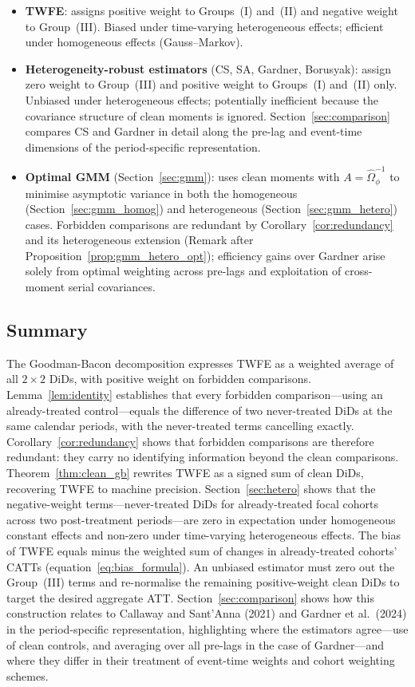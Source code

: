 \documentclass[12pt,letterpaper]{article}
\theoremstyle{remark}
\theoremstyle{definition}
\begin{document}
\begin{itemize}
  \item \textbf{TWFE}: assigns positive weight to Groups~(I) and~(II) and
    negative weight to Group~(III). Biased under time-varying heterogeneous
    effects; efficient under homogeneous effects (Gauss--Markov).

  \item \textbf{Heterogeneity-robust estimators} (CS, SA, Gardner, Borusyak):
    assign zero weight to Group~(III) and positive weight to Groups~(I)
    and~(II) only. Unbiased under heterogeneous effects; potentially
    inefficient because the covariance structure of clean moments is ignored.
    Section~\ref{sec:comparison} compares CS and Gardner in detail along the
    pre-lag and event-time dimensions of the period-specific representation.

  \item \textbf{Optimal GMM} (Section~\ref{sec:gmm}): uses clean moments
    with $A=\hat{\Omega}_\phi^{-1}$ to minimise asymptotic variance in both
    the homogeneous (Section~\ref{sec:gmm_homog}) and heterogeneous
    (Section~\ref{sec:gmm_hetero}) cases. Forbidden comparisons are
    redundant by Corollary~\ref{cor:redundancy} and its heterogeneous
    extension (Remark after Proposition~\ref{prop:gmm_hetero_opt});
    efficiency gains over Gardner arise solely from optimal weighting across
    pre-lags and exploitation of cross-moment serial covariances.
\end{itemize}

\subsection{Summary}

The Goodman-Bacon decomposition expresses TWFE as a weighted average of all
$2\times2$ DiDs, with positive weight on forbidden comparisons.
Lemma~\ref{lem:identity} establishes that every forbidden comparison---using an
already-treated control---equals the difference of two never-treated DiDs at the
same calendar periods, with the never-treated terms cancelling exactly.
Corollary~\ref{cor:redundancy} shows that forbidden comparisons are therefore
redundant: they carry no identifying information beyond the clean comparisons.
Theorem~\ref{thm:clean_gb} rewrites TWFE as a signed sum of clean DiDs,
recovering TWFE to machine precision. Section~\ref{sec:hetero} shows that the
negative-weight terms---never-treated DiDs for already-treated focal cohorts
across two post-treatment periods---are zero in expectation under homogeneous
constant effects and non-zero under time-varying heterogeneous effects. The bias
of TWFE equals minus the weighted sum of changes in already-treated cohorts'
CATTs (equation~\eqref{eq:bias_formula}). An unbiased estimator must zero out
the Group~(III) terms and re-normalise the remaining positive-weight clean DiDs
to target the desired aggregate ATT. Section~\ref{sec:comparison} shows how
this construction relates to Callaway and Sant'Anna (2021) and Gardner
et al.\ (2024) in the period-specific representation, highlighting where the
estimators agree---use of clean controls, and averaging over all pre-lags in
the case of Gardner---and where they differ in their treatment of event-time
weights and cohort weighting schemes.
\end{document}
